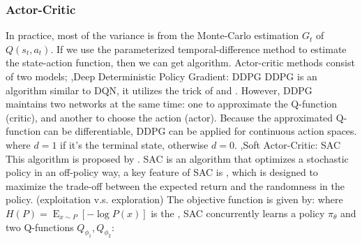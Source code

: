 \documentclass[12pt]{report}
\begin{document}
\subsubsection{Actor-Critic}
In practice, most of the variance is from the Monte-Carlo estimation $G_t$ of $Q(s_t,a_t)$. If we use the parameterized temporal-difference method to
estimate the state-action function, then we can get  algorithm. Actor-critic methods consist of two models;
\sep{Deep Deterministic Policy Gradient: DDPG}
DDPG is an algorithm similar to DQN, it utilizes the trick of  and . However,
DDPG maintains two networks at the same time: one to approximate the Q-function (critic), and another to choose the action (actor).
Because the approximated Q-function can be differentiable, DDPG can be applied for continuous action spaces.
where $d=1$ if it's the terminal state, otherwise $d=0$.
\sep{Soft Actor-Critic: SAC}
This algorithm is proposed by \cite{haarnoja2018soft}. SAC is an algorithm that optimizes a stochastic policy in an off-policy way, a key feature
of SAC is , which is designed to maximize the trade-off between the expected return and the randomness in the policy. (exploitation v.s. exploration)
The objective function is given by:
where $H(P)=\operatorname*{E}_{x\sim P}\left[-\log P(x)\right]$ is the , SAC concurrently learns a policy $\pi_\theta$ and two Q-functions $Q_{\phi_1},Q_{\phi_2}$:
\end{document}
